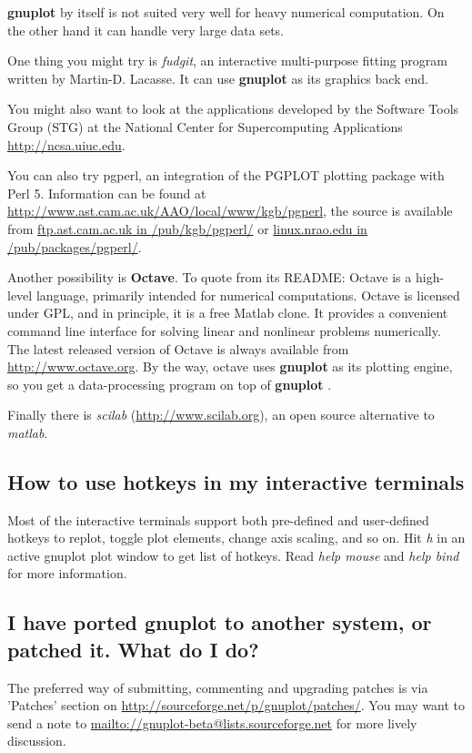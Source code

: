 \documentclass[a4paper,11pt]{article}
\def\http#1{{\small\href{http://#1}{\url{http://#1}}}}
\def\mailto#1{{\small\href{mailto://#1}{\url{mailto://#1}}}}
\def\ftp#1#2{\href{ftp://#1#2}{\url{#1} in \url{#2}}}
\newcommand{\ftp}[2]%
            {\htmladdnormallink{\latex{\url{#1}{} in \url{#2}}%
                    \html{\textit{#1} in \textit{#2}}}%
                {ftp://#1#2}%
            }
\newcommand{\mailto}[1]%
            {\htmladdnormallink{\latex{\url{<#1>}}\html{\textit{#1}}}%
                {mailto:#1}%
            }
\newcommand{\http}[1]%
            {\htmladdnormallink{\latex{\url{http://#1}}%
                    \html{\textit{http://#1}}}%
                {http://#1}%
            }
\newcommand{\gnuplot}{\textbf{gnuplot }}
\begin{document}
\gnuplot by itself is not suited very well for heavy numerical computation. 
On the other hand it can handle very large data sets.

One thing you might try is \textit{fudgit}, an interactive multi-purpose
fitting program written by Martin-D. Lacasse.
It can use \gnuplot as its graphics back end.

You might also want to look at the applications developed by
the Software Tools Group (STG) at the National Center for
Supercomputing Applications \http{ncsa.uiuc.edu}.

You can also try pgperl, an integration of the PGPLOT plotting
package with Perl 5. Information can be found at
\http{www.ast.cam.ac.uk/AAO/local/www/kgb/pgperl}, the source is
available from \ftp{ftp.ast.cam.ac.uk}{/pub/kgb/pgperl/} or
\ftp{linux.nrao.edu}{/pub/packages/pgperl/}.

Another possibility is \textbf{Octave}. To quote from its README: Octave is a
high-level language, primarily intended for numerical computations. Octave is
licensed under GPL, and in principle, it is a free Matlab clone. It provides a
convenient command line interface for solving linear and nonlinear problems
numerically. The latest released version of Octave is always available from
\http{www.octave.org}. By the way, octave uses \gnuplot as its plotting
engine, so you get a data-processing program on top of \gnuplot.

Finally there is \textit{scilab} (\http{www.scilab.org}), an open source
alternative to \textit{matlab}.


\subsection{How to use hotkeys in my interactive terminals}

Most of the interactive terminals support both pre-defined and user-defined
hotkeys to replot, toggle plot elements, change axis scaling, and so on.
Hit \textit{h} in an active gnuplot plot window to get list of hotkeys. 
Read \textit{help mouse} and \textit{help bind} for more information.


\subsection{I have ported \gnuplot to another system, or patched it. What
do I do?}

The preferred way of submitting, commenting and upgrading patches is
via 'Patches' section on 
\http{sourceforge.net/p/gnuplot/patches/}.
You may want to send a note to \mailto{gnuplot-beta@lists.sourceforge.net} for
more lively discussion.
\end{document}
